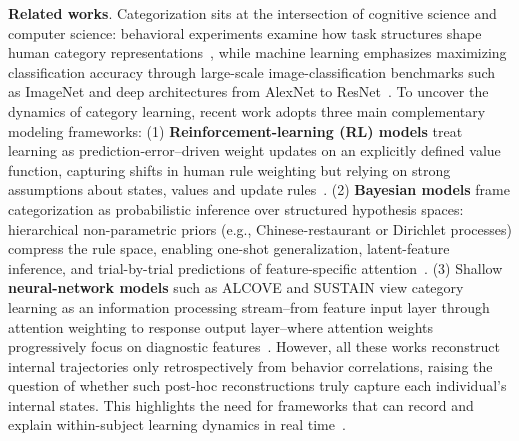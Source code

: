  \textbf{Related works}. Categorization sits at the intersection of cognitive science and computer science: behavioral experiments examine how task structures shape human category representations~\cite{shepard1961learning,medin1978context,nosofsky1986attention,kruschke2020alcove}, while machine learning emphasizes maximizing classification accuracy through large-scale image-classification benchmarks such as ImageNet and deep architectures from AlexNet to ResNet~\cite{deng2009imagenet,russakovsky2015imagenet,krizhevsky2012imagenet,he2016deep}. To uncover the dynamics of category learning, recent work adopts three main complementary modeling frameworks: (1) \textbf{Reinforcement-learning (RL) models} treat learning as prediction-error–driven weight updates on an explicitly defined value function, capturing shifts in human rule weighting but relying on strong assumptions about states, values and update rules~\cite{sutton1998reinforcement,cohen2013high,cohen2021geometry}. (2) \textbf{Bayesian models} frame categorization as probabilistic inference over structured hypothesis spaces: hierarchical non-parametric priors (e.g., Chinese-restaurant or Dirichlet processes) compress the rule space, enabling one-shot generalization, latent-feature inference, and trial-by-trial predictions of feature-specific attention~\cite{sanborn2006more,tenenbaum2001generalization}. (3) Shallow \textbf{neural-network models} such as ALCOVE and SUSTAIN view category learning as an information processing stream--from feature input layer through attention weighting to response output layer--where attention weights progressively focus on diagnostic features~\cite{mack2020ventromedial, mack2016dynamic}. However, all these works reconstruct internal trajectories only retrospectively from behavior correlations, raising the question of whether such post-hoc reconstructions truly capture each individual’s internal states. This highlights the need for frameworks that can record and explain within-subject learning dynamics in real time~\cite{gershman2015computational,lieder2020resource}.